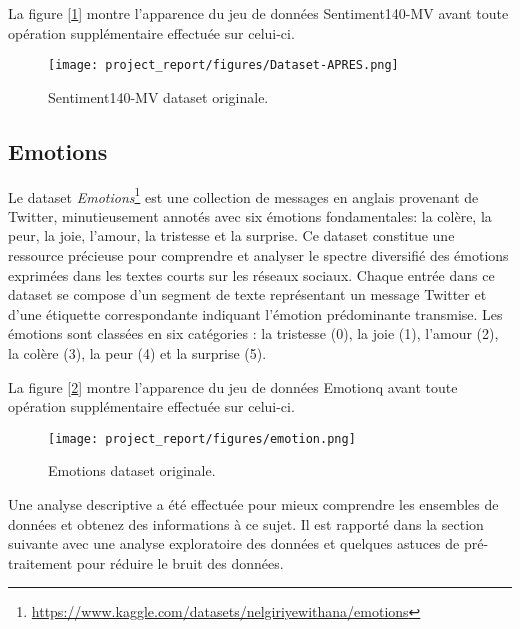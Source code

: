 La figure [\ref{fig:figure8}]  montre l'apparence du jeu de données Sentiment140-MV avant toute opération supplémentaire effectuée sur celui-ci.


\begin{figure}[h]
    \centering
    \texttt{[image: project\_report/figures/Dataset-APRES.png]} 
    \caption{Sentiment140-MV dataset originale. }
        \label{fig:figure8}
 
\end{figure}

\subsection{Emotions}
Le dataset \textit{Emotions}\footnote{\href{https://www.kaggle.com/datasets/nelgiriyewithana/emotions} {https://www.kaggle.com/datasets/nelgiriyewithana/emotions}} est une collection de messages en anglais provenant de Twitter, minutieusement annotés avec six émotions fondamentales: la colère, la peur, la joie, l'amour, la tristesse et la surprise. Ce dataset constitue une ressource précieuse pour comprendre et analyser le spectre diversifié des émotions exprimées dans les textes courts sur les réseaux sociaux. Chaque entrée dans ce dataset se compose d'un segment de texte représentant un message Twitter et d'une étiquette correspondante indiquant l'émotion prédominante transmise. Les émotions sont classées en six catégories : la tristesse (0), la joie (1), l'amour (2), la colère (3), la peur (4) et la surprise (5).

La figure [\ref{fig:figEm}]  montre l'apparence du jeu de données Emotionq avant toute opération supplémentaire effectuée sur celui-ci.

\begin{figure}[h]
    \centering
    \texttt{[image: project\_report/figures/emotion.png]}
    \caption{Emotions dataset originale.}
    \label{fig:figEm}
\end{figure}




Une analyse descriptive a été effectuée pour mieux comprendre les ensembles de données et obtenez des informations à ce sujet. Il est rapporté dans la section suivante avec une analyse exploratoire des données et quelques astuces de pré-traitement pour réduire le bruit des données.




